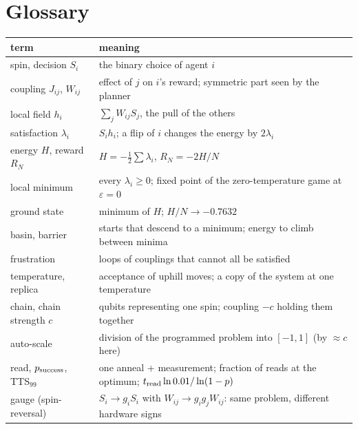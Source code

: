 \documentclass[11pt,a4paper]{article}
\begin{document}
\section{Glossary}
\begin{longtable}{p{4.2cm}p{10.8cm}}
\toprule
term & meaning \\ \midrule\endhead
spin, decision $S_i$ & the binary choice of agent $i$ \\
coupling $J_{ij}$, $W_{ij}$ & effect of $j$ on $i$'s reward; symmetric part seen by the planner \\
local field $h_i$ & $\sum_jW_{ij}S_j$, the pull of the others \\
satisfaction $\lambda_i$ & $S_ih_i$; a flip of $i$ changes the energy by $2\lambda_i$ \\
energy $H$, reward $R_N$ & $H=-\frac12\sum\lambda_i$, $R_N=-2H/N$ \\
local minimum & every $\lambda_i\ge0$; fixed point of the zero-temperature game at $\varepsilon=0$ \\
ground state & minimum of $H$; $H/N\to-0.7632$ \\
basin, barrier & starts that descend to a minimum; energy to climb between minima \\
frustration & loops of couplings that cannot all be satisfied \\
temperature, replica & acceptance of uphill moves; a copy of the system at one temperature \\
chain, chain strength $c$ & qubits representing one spin; coupling $-c$ holding them together \\
auto-scale & division of the programmed problem into $[-1,1]$ (by $\approx c$ here) \\
read, $p_{\rm success}$, TTS$_{99}$ & one anneal + measurement; fraction of reads at the optimum; $t_{\rm read}\ln0.01/\ln(1-p)$ \\
gauge (spin-reversal) & $S_i\to g_iS_i$ with $W_{ij}\to g_ig_jW_{ij}$: same problem, different hardware signs \\
\bottomrule
\end{longtable}
\end{document}
